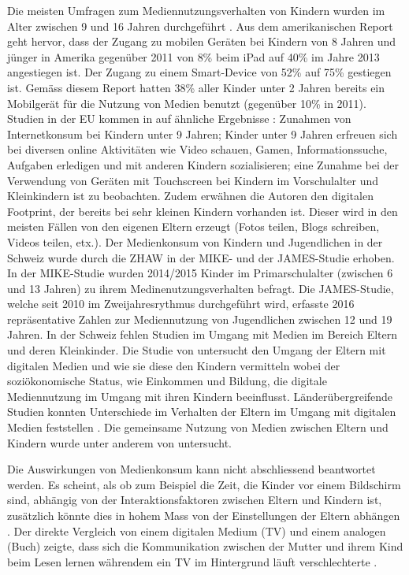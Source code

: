 Die meisten Umfragen zum Mediennutzungsverhalten von Kindern wurden im Alter zwischen 9 und 16 Jahren durchgeführt \cite{Chaudron2015}. Aus dem amerikanischen Report  geht hervor, dass der Zugang zu mobilen Geräten bei Kindern von 8 Jahren und jünger in Amerika gegenüber 2011 von 8\% beim iPad auf 40\% im Jahre 2013 angestiegen ist. Der Zugang zu einem Smart-Device von 52\% auf 75\% gestiegen ist. Gemäss diesem Report hatten 38\% aller Kinder unter 2 Jahren bereits ein Mobilgerät für die Nutzung von Medien benutzt (gegenüber 10\% in 2011). Studien in der EU kommen in auf ähnliche Ergebnisse \cite{Holloway2013}: Zunahmen von Internetkonsum bei Kindern unter 9 Jahren; Kinder unter 9 Jahren erfreuen sich bei diversen online Aktivitäten wie Video schauen, Gamen, Informationssuche, Aufgaben erledigen und mit anderen Kindern sozialisieren; eine Zunahme bei der Verwendung von Geräten mit Touchscreen bei Kindern im Vorschulalter und Kleinkindern ist zu beobachten. Zudem erwähnen die Autoren den digitalen Footprint, der bereits bei sehr kleinen Kindern vorhanden ist. Dieser wird in den meisten Fällen von den eigenen Eltern erzeugt (Fotos teilen, Blogs schreiben, Videos teilen, etx.).
Der Medienkonsum von Kindern und Jugendlichen in der Schweiz wurde durch die ZHAW in der MIKE- und der JAMES-Studie \cite{Suter2015, Waller2016} erhoben. In der MIKE-Studie wurden 2014/2015 Kinder im Primarschulalter (zwischen 6 und 13 Jahren) zu ihrem Medinenutzungsverhalten befragt. Die JAMES-Studie, welche seit 2010 im Zweijahresrythmus durchgeführt wird, erfasste 2016 repräsentative Zahlen zur Mediennutzung von Jugendlichen zwischen 12 und 19 Jahren. In der Schweiz fehlen Studien im Umgang mit Medien im Bereich Eltern und deren Kleinkinder. Die Studie von  untersucht den Umgang der Eltern mit digitalen Medien und wie sie diese den Kindern vermitteln wobei der soziökonomische Status, wie Einkommen und Bildung, die digitale Mediennutzung im Umgang mit ihren Kindern beeinflusst. Länderübergreifende Studien konnten Unterschiede im Verhalten der Eltern im Umgang mit digitalen Medien feststellen \cite{Helsper2013}. Die gemeinsame Nutzung von Medien zwischen Eltern und Kindern wurde unter anderem von  untersucht. 

Die Auswirkungen von Medienkonsum kann nicht abschliessend beantwortet werden. Es scheint, als ob zum Beispiel die Zeit, die Kinder vor einem Bildschirm sind, abhängig von der Interaktionsfaktoren zwischen Eltern und Kindern ist, zusätzlich könnte dies in hohem Mass von der Einstellungen der Eltern abhängen \cite{Lauricella2015}. Der direkte Vergleich von einem digitalen Medium (TV) und einem analogen (Buch) zeigte, dass sich die Kommunikation zwischen der Mutter und ihrem Kind beim Lesen lernen währendem ein TV im Hintergrund läuft verschlechterte \cite{Nathanson2011}.

